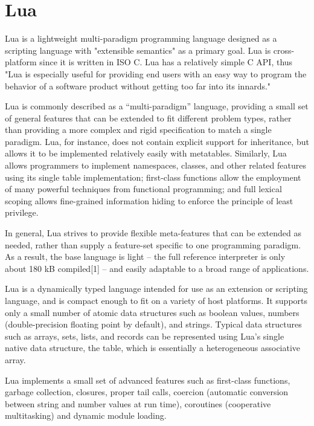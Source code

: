 	
	
	
	
	\newpage
	\section{Lua}
	
	Lua is a lightweight multi-paradigm programming language designed as a scripting language with "extensible semantics" as a primary goal. Lua is cross-platform since it is written in ISO C. Lua has a relatively simple C API, thus "Lua is especially useful for providing end users with an easy way to program the behavior of a software product without getting too far into its innards."
	
	\vpara
	Lua is commonly described as a “multi-paradigm” language, providing a small set of general features that can be extended to fit different problem types, rather than providing a more complex and rigid specification to match a single paradigm. Lua, for instance, does not contain explicit support for inheritance, but allows it to be implemented relatively easily with metatables. Similarly, Lua allows programmers to implement namespaces, classes, and other related features using its single table implementation; first-class functions allow the employment of many powerful techniques from functional programming; and full lexical scoping allows fine-grained information hiding to enforce the principle of least privilege.
	
	\vpara
	In general, Lua strives to provide flexible meta-features that can be extended as needed, rather than supply a feature-set specific to one programming paradigm. As a result, the base language is light – the full reference interpreter is only about 180 kB compiled[1] – and easily adaptable to a broad range of applications.
	
	\vpara
	Lua is a dynamically typed language intended for use as an extension or scripting language, and is compact enough to fit on a variety of host platforms. It supports only a small number of atomic data structures such as boolean values, numbers (double-precision floating point by default), and strings. Typical data structures such as arrays, sets, lists, and records can be represented using Lua’s single native data structure, the table, which is essentially a heterogeneous associative array.
	
	\vpara
	Lua implements a small set of advanced features such as first-class functions, garbage collection, closures, proper tail calls, coercion (automatic conversion between string and number values at run time), coroutines (cooperative multitasking) and dynamic module loading.
	
